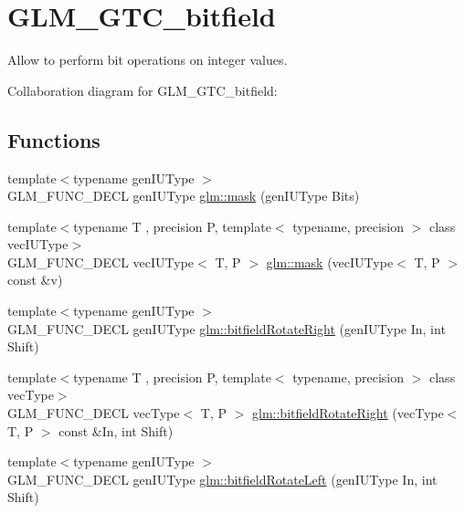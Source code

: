 \hypertarget{group__gtc__bitfield}{\section{G\-L\-M\-\_\-\-G\-T\-C\-\_\-bitfield}
\label{group__gtc__bitfield}
}


Allow to perform bit operations on integer values.  


Collaboration diagram for G\-L\-M\-\_\-\-G\-T\-C\-\_\-bitfield\-:
\subsection*{Functions}
\begin{DoxyCompactItemize}
\item 
{\footnotesize template$<$typename gen\-I\-U\-Type $>$ }\\G\-L\-M\-\_\-\-F\-U\-N\-C\-\_\-\-D\-E\-C\-L gen\-I\-U\-Type \hyperlink{group__gtc__bitfield_gad7eba518a0b71662114571ee76939f8a}{glm\-::mask} (gen\-I\-U\-Type Bits)
\item 
{\footnotesize template$<$typename T , precision P, template$<$ typename, precision $>$ class vec\-I\-U\-Type$>$ }\\G\-L\-M\-\_\-\-F\-U\-N\-C\-\_\-\-D\-E\-C\-L vec\-I\-U\-Type$<$ T, P $>$ \hyperlink{group__gtc__bitfield_ga073dbd8642f550b51da3572541431c1c}{glm\-::mask} (vec\-I\-U\-Type$<$ T, P $>$ const \&v)
\item 
{\footnotesize template$<$typename gen\-I\-U\-Type $>$ }\\G\-L\-M\-\_\-\-F\-U\-N\-C\-\_\-\-D\-E\-C\-L gen\-I\-U\-Type \hyperlink{group__gtc__bitfield_ga1c33d075c5fb8bd8dbfd5092bfc851ca}{glm\-::bitfield\-Rotate\-Right} (gen\-I\-U\-Type In, int Shift)
\item 
{\footnotesize template$<$typename T , precision P, template$<$ typename, precision $>$ class vec\-Type$>$ }\\G\-L\-M\-\_\-\-F\-U\-N\-C\-\_\-\-D\-E\-C\-L vec\-Type$<$ T, P $>$ \hyperlink{group__gtc__bitfield_ga96b56fd2adad1eeaee9e10dfe83904ba}{glm\-::bitfield\-Rotate\-Right} (vec\-Type$<$ T, P $>$ const \&In, int Shift)
\item 
{\footnotesize template$<$typename gen\-I\-U\-Type $>$ }\\G\-L\-M\-\_\-\-F\-U\-N\-C\-\_\-\-D\-E\-C\-L gen\-I\-U\-Type \hyperlink{group__gtc__bitfield_ga2eb49678a344ce1495bdb5586d9896b9}{glm\-::bitfield\-Rotate\-Left} (gen\-I\-U\-Type In, int Shift)
\item 

\end{DoxyCompactItemize}
